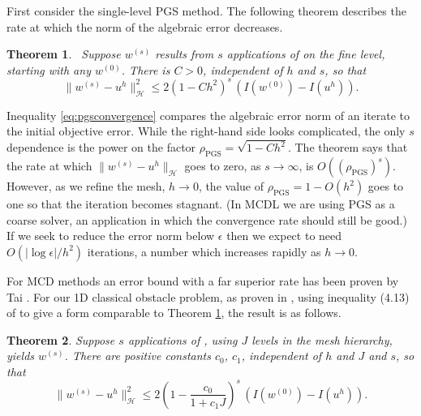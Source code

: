 \documentclass[letterpaper,final,12pt,reqno]{amsart}
\theoremstyle{claim}
\newtheorem{theorem}{Theorem}
\newcommand{\eps}{\epsilon}
\numberwithin{equation}{section}
\numberwithin{figure}{section}
\numberwithin{table}{section}
\numberwithin{theorem}{section}
\begin{document}
First consider the single-level PGS method.  The following theorem describes the rate at which the norm of the algebraic error decreases.

\begin{theorem} \cite[Prop.~4.5]{GraeserKornhuber2009}\,  \label{thm:pgsconvergence}  Suppose $w^{(s)}$  results from $s$ applications of  on the fine level, starting with any $w^{(0)}$.  There is $C>0$, independent of $h$ and $s$, so that
\begin{equation}
  \|w^{(s)} - u^h\|_{\mathcal{H}}^2 \le 2 (1-C h^2)^s\,\left(I(w^{(0)}) - I(u^h)\right).  \label{eq:pgsconvergence}
\end{equation}
\end{theorem}

Inequality \eqref{eq:pgsconvergence} compares the algebraic error norm of an iterate to the initial objective error.  While the right-hand side looks complicated, the only $s$ dependence is the power on the factor $\rho_{\text{PGS}} = \sqrt{1-Ch^2}$.  The theorem says that the rate at which $\|w^{(s)} - u^h\|_{\mathcal{H}}$ goes to zero, as $s\to \infty$, is $O((\rho_{\text{PGS}})^s)$.  However, as we refine the mesh, $h\to 0$, the value of $\rho_{\text{PGS}} = 1 - O(h^2)$ goes to one so that the iteration becomes stagnant.  (In MCDL we are using PGS as a coarse solver, an application in which the convergence rate should still be good.)  If we seek to reduce the error norm below $\eps$ then we expect to need $O(|\log\eps|/h^2)$ iterations, a number which increases rapidly as $h\to 0$.

For MCD methods an error bound with a far superior rate has been proven by Tai \cite{Tai2003}.  For our 1D classical obstacle problem, as proven in \cite[section 5.4]{Tai2003}, using inequality (4.13) of \cite{GraeserKornhuber2009} to give a form comparable to Theorem \ref{thm:pgsconvergence}, the result is as follows.

\begin{theorem} \label{thm:mcdconvergence}  Suppose $s$ applications of , using $J$ levels in the mesh hierarchy, yields $w^{(s)}$.  There are positive constants $c_0$, $c_1$, independent of $h$ and $J$ and $s$, so that
\begin{equation}
  \|w^{(s)} - u^h\|_{\mathcal{H}}^2 \le 2 \left(1-\frac{c_0}{1+c_1 J}\right)^s\,\left(I(w^{(0)}) - I(u^h)\right).  \label{eq:mcdconvergence}
\end{equation}
\end{theorem}
\end{document}
